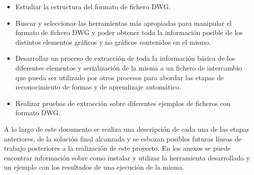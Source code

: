 \begin{itemize}

\item{Estudiar la estructura del formato de fichero DWG.}
\item{Buscar y seleccionar las herramientas más apropiadas para manipular el formato de fichero DWG y poder obtener toda la información posible de los distintos elementos gráficos y no gráficos contenidos en el mismo.}
\item{Desarrollar un proceso de extracción de toda la información básica de los diferentes elementos y serialización de la misma a un fichero de intercambio que pueda ser utilizado por otros procesos para abordar las etapas de reconocimiento de formas y de aprendizaje automático.}
\item{Realizar pruebas de extracción sobre diferentes ejemplos de ficheros con formato DWG.}

\end{itemize}

A lo largo de este documento se realiza una descripción de cada una de las etapas anteriores, de la solución final alcanzada y se esbozan posibles futuras líneas de trabajo posteriores a la realización de este proyecto. En los anexos se puede encontrar información sobre como instalar y utilizar la herramienta desarrollada y un ejemplo con los resultados de una ejecución de la misma.
